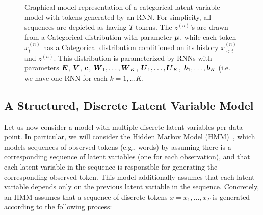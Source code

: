 \documentclass{article}
\begin{document}
\begin{figure}
\centering
{}
 \caption{Graphical model representation of a categorical latent variable model with tokens generated by an RNN. For simplicity, all sequences are depicted as having $T$ tokens. The $z^{(n)}$'s are drawn from a Categorical distribution with parameter $\boldsymbol{\mu}$, while each token $x^{(n)}_t$ has a Categorical distribution conditioned on its history $x^{(n)}_{<t}$ and $z^{(n)}$. This distribution is parameterized by RNNs with parameters $\boldsymbol{E}$, $\boldsymbol{V}$, $\mathbf{c}$, $\boldsymbol{W}_1, \ldots, \boldsymbol{W}_K$, $\boldsymbol{U}_1, \ldots, \boldsymbol{U}_K$, $\boldsymbol{b}_1,\ldots,\boldsymbol{b}_K$ (i.e. we have one RNN for each $k = 1, \dots K$.}
 \label{fig:catrnngm}
\end{figure}


\subsection{A Structured, Discrete Latent Variable Model}
\label{sec:structlatmodel}
Let us now consider a model with multiple discrete latent variables per data-point. In particular, we will consider the Hidden Markov Model (HMM)~\citep{rabiner1989tutorial}, which models sequences of observed tokens (e.g., words) by assuming there is a corresponding sequence of latent variables (one for each observation), and that each latent variable in the sequence is responsible for generating the corresponding observed token. This model additionally assumes that each latent variable depends only on the previous latent variable in the sequence. Concretely, an HMM assumes that a sequence of discrete tokens $x = x_1, \ldots, x_T$ is generated according to the following process:
\end{document}
